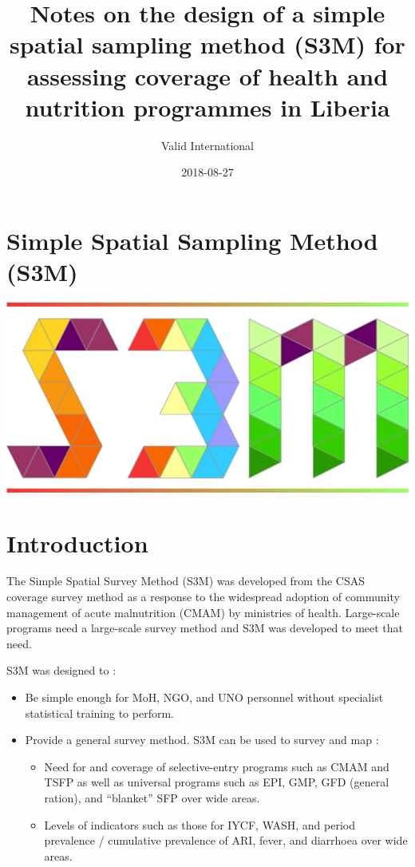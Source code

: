 \documentclass[12pt,a4paper]{book}
\title{Notes on the design of a simple spatial sampling method (S3M) for
assessing coverage of health and nutrition programmes in Liberia}
\author{Valid International}
\date{2018-08-27}
\theoremstyle{definition}
\theoremstyle{definition}
\theoremstyle{definition}
\theoremstyle{remark}
\begin{document}
\maketitle

{
\hypersetup{linkcolor=black}
\setcounter{tocdepth}{1}
\tableofcontents
}
\hypertarget{simple-spatial-sampling-method-s3m}{%
\chapter*{Simple Spatial Sampling Method
(S3M)}\label{simple-spatial-sampling-method-s3m}}

\includegraphics{figures/s3mlogo.png}

\hypertarget{introduction}{%
\chapter{Introduction}\label{introduction}}

The Simple Spatial Survey Method (S3M) was developed from the CSAS
coverage survey method as a response to the widespread adoption of
community management of acute malnutrition (CMAM) by ministries of
health. Large-scale programs need a large-scale survey method and S3M
was developed to meet that need.

S3M was designed to :

\begin{itemize}
\item
  Be simple enough for MoH, NGO, and UNO personnel without specialist
  statistical training to perform.
\item
  Provide a general survey method. S3M can be used to survey and map :

  \begin{itemize}
  \item
    Need for and coverage of selective-entry programs such as CMAM and
    TSFP as well as universal programs such as EPI, GMP, GFD (general
    ration), and ``blanket'' SFP over wide areas.
  \item
    Levels of indicators such as those for IYCF, WASH, and period
    prevalence / cumulative prevalence of ARI, fever, and diarrhoea over
    wide areas.
  \end{itemize}
\end{itemize}
\end{document}
